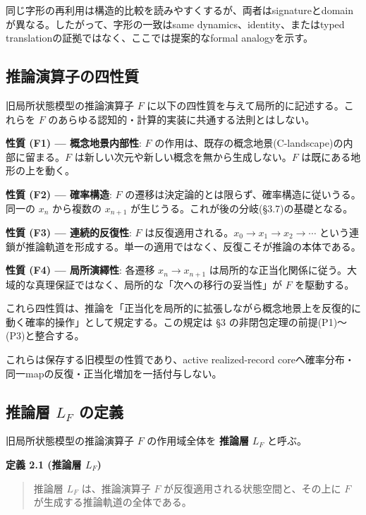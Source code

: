 同じ字形の再利用は構造的比較を読みやすくするが、両者はsignatureとdomainが異なる。したがって、字形の一致はsame dynamics、identity、またはtyped translationの証拠ではなく、ここでは提案的なformal analogyを示す。

\bigskip


\subsection{推論演算子の四性質}


旧局所状態模型の推論演算子 $F$ に以下の四性質を与えて局所的に記述する。これらを $F$ のあらゆる認知的・計算的実装に共通する法則とはしない。

\textbf{性質 (F1) — 概念地景内部性}:
$F$ の作用は、既存の概念地景(C-landscape)の内部に留まる。$F$ は新しい次元や新しい概念を無から生成しない。$F$ は既にある地形の上を動く。

\textbf{性質 (F2) — 確率構造}:
$F$ の遷移は決定論的とは限らず、確率構造に従いうる。同一の $x_n$ から複数の $x_{n+1}$ が生じうる。これが後の分岐(\S{}3.7)の基礎となる。

\textbf{性質 (F3) — 連続的反復性}:
$F$ は反復適用される。$x_0 \to x_1 \to x_2 \to \cdots$ という連鎖が推論軌道を形成する。単一の適用ではなく、反復こそが推論の本体である。

\textbf{性質 (F4) — 局所演繹性}:
各遷移 $x_n \to x_{n+1}$ は局所的な正当化関係に従う。大域的な真理保証ではなく、局所的な「次への移行の妥当性」が $F$ を駆動する。

これら四性質は、推論を「正当化を局所的に拡張しながら概念地景上を反復的に動く確率的操作」として規定する。この規定は \S{}3 の非閉包定理の前提(P1)〜(P3)と整合する。

これらは保存する旧模型の性質であり、active realized-record coreへ確率分布・同一mapの反復・正当化増加を一括付与しない。

\bigskip


\subsection{推論層 $L_F$ の定義}


旧局所状態模型の推論演算子 $F$ の作用域全体を \textbf{推論層} $L_F$ と呼ぶ。

\textbf{定義 2.1 (推論層 $L_F$)}

\begin{quote}
推論層 $L_F$ は、推論演算子 $F$ が反復適用される状態空間と、その上に $F$ が生成する推論軌道の全体である。
\end{quote}



